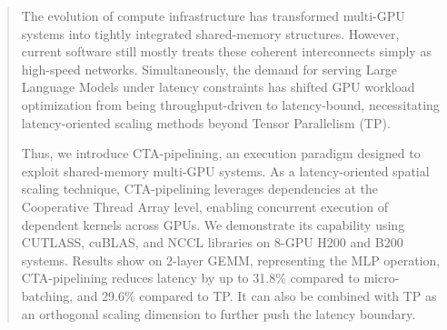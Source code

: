 \documentclass[conference]{IEEEtran}
\begin{document}
\begin{abstract}

The evolution of compute infrastructure has transformed multi-GPU systems into tightly integrated shared-memory structures. However, current software still mostly treats these coherent interconnects simply as high-speed networks. Simultaneously, the demand for serving Large Language Models under latency constraints has shifted GPU workload optimization from being throughput-driven to latency-bound, necessitating latency-oriented scaling methods beyond Tensor Parallelism (TP).

Thus, we introduce CTA-pipelining, an execution paradigm designed to exploit shared-memory multi-GPU systems. As a latency-oriented spatial scaling technique, CTA-pipelining leverages dependencies at the Cooperative Thread Array level, enabling concurrent execution of dependent kernels across GPUs. We demonstrate its capability using CUTLASS, cuBLAS, and NCCL libraries on 8-GPU H200 and B200 systems. Results show on 2-layer GEMM, representing the MLP operation, CTA-pipelining reduces latency by up to 31.8\% compared to micro-batching, and 29.6\% compared to TP. It can also be combined with TP as an orthogonal scaling dimension to further push the latency boundary. 





\end{abstract}
\end{document}
